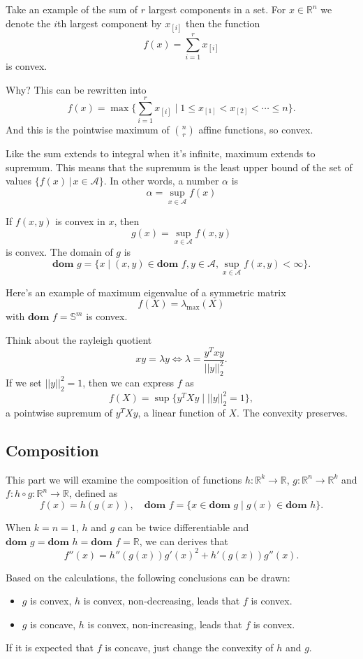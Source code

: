 \documentclass[lang=en,color=blue,mode=fancy,titlestyle=hang]{elegantbook}
\begin{document}
Take an example of the sum of $r$ largest components in a set. For $x \in \mathbb{R}^n$
we denote the $i$th largest component by $x_{[i]}$ then the function
\[
f(x) = \sum_{i = 1}^r x_{[i]}
\]
is convex.

Why? This can be rewritten into
\[
f(x) = \max\{\sum_{i = 1}^r x_{[i]} \;|\; 1 \leq x_{[1]} < x_{[2]} < \cdots \leq n\}.
\]
And this is the pointwise maximum of $\binom{n}{r}$ affine functions, so convex.

Like the sum extends to integral when it's infinite, maximum extends to supremum.
This means that the supremum is the least upper bound of the set of values
$\{f(x)\,|\,x\in\mathcal{A}\}$. In other words, a number $\alpha$ is
\[
\alpha=\sup_{x\in\mathcal{A}} f(x)
\]

If $f(x, y)$ is convex in $x$, then
\[
g(x) = \sup_{x\in\mathcal{A}} f(x, y)
\]
is convex. The domain of $g$ is
\[
\textbf{dom } g = \{ x \;|\; (x, y) \in \textbf{dom } f, y \in \mathcal{A}, \sup_{x\in\mathcal{A}} f(x, y) < \infty \}.
\]

Here's an example of maximum eigenvalue of a symmetric matrix
\[
f(X) = \lambda_{\max}(X)
\]
with $\textbf{dom } f = \mathbb{S}^m$ is convex.

Think about the rayleigh quotient
\[
x y = \lambda y \Leftrightarrow \lambda = \frac{y^T x y}{||y||_2^2}.
\]
If we set $||y||_2^2 = 1$, then we can express $f$ as
\[
f(X) = \sup\{y^T X y \;|\; ||y||_2^2 = 1\},
\]
a pointwise supremum of $y^T X y$, a linear function of $X$. The convexity preserves.

\subsection{Composition}

This part we will examine the composition of functions $h: \mathbb{R}^k \rightarrow \mathbb{R}$,
$g: \mathbb{R}^n \rightarrow \mathbb{R}^k$ and $f: h \circ g: \mathbb{R}^n \rightarrow \mathbb{R}$,
defined as
\[
f(x) = h(g(x)), \quad \textbf{dom } f = \{x \in \textbf{dom } g \;|\; g(x) \in \textbf{dom } h\}.
\]

When $k = n = 1$, $h$ and $g$ can be twice differentiable and
$\textbf{dom } g = \textbf{dom } h = \textbf{dom } f = \mathbb{R}$, we can derives that
\[
f''(x) = h''(g(x)){g'(x)}^2 + h'(g(x))g''(x).
\]

Based on the calculations, the following conclusions can be drawn:
\begin{itemize}
  \item $g$ is convex, $h$ is convex, non-decreasing, leads that $f$ is convex.
  \item $g$ is concave, $h$ is convex, non-increasing, leads that $f$ is convex.
\end{itemize}
If it is expected that $f$ is concave, just change the convexity of $h$ and $g$.
\end{document}

